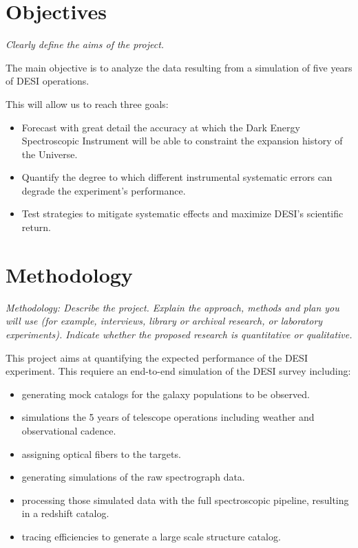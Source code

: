 \documentclass[12pt]{article}
\begin{document}
{}





\section*{Objectives}
\textit{Clearly define the aims of the project.}

The main objective is to analyze the data resulting from a simulation
of five years of DESI operations.  

This will allow us to reach three goals:
\begin{itemize}
\item Forecast with great detail the accuracy at which the Dark Energy
  Spectroscopic Instrument will be able to constraint the expansion
  history of the Universe.  
\item Quantify the degree to which different instrumental systematic
  errors can degrade the experiment's performance.
\item Test strategies to mitigate systematic effects and maximize
  DESI's scientific return.
\end{itemize}


\section*{Methodology}
\textit{Methodology: Describe the project. Explain the approach, methods and
plan you will use (for example, interviews, library or archival
research, or laboratory experiments). Indicate whether the proposed
research is quantitative or qualitative. }


This project aims at quantifying the expected performance of the DESI
experiment. 
This requiere an end-to-end simulation of the DESI survey including:
\begin{itemize}
\item generating mock catalogs for the galaxy populations to be
  observed.
\item simulations the 5 years of telescope operations including
  weather and observational cadence.
\item assigning optical fibers to the targets.
\item generating simulations of the raw spectrograph data.
\item processing those simulated data with the full spectroscopic
  pipeline, resulting in a redshift catalog.
\item tracing efficiencies to generate a large scale structure
  catalog.
\end{itemize}
\end{document}
